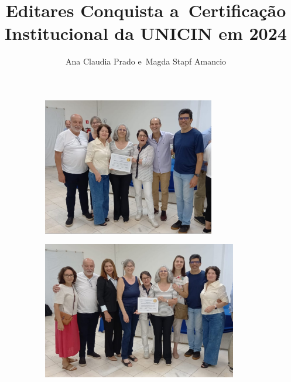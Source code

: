 \documentclass{gescons}
\author{Ana Claudia Prado e~Magda Stapf Amancio}
\title{Editares Conquista a~Certificação Institucional da UNICIN em 2024}
\begin{document}
    \makeentrevistatitle


    




\begin{figure}[h]
  \centering
  \begin{subfigure}[b]{0.49\textwidth}
    \includegraphics[height=60mm,keepaspectratio]{articles/resumo/fotos/materia3/d94f6571-cf63-48d2-976b-507cbf8cafc5.jpg}
\end{subfigure}
\begin{subfigure}[b]{0.49\textwidth}
    \includegraphics[height=60mm,keepaspectratio]{articles/resumo/fotos/materia3/06eb15bb-01a3-43d5-84e2-67f62c13a53e.jpg}
  \end{subfigure}
\end{figure}
\end{document}

